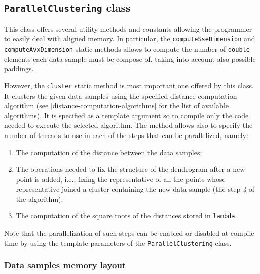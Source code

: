 \documentclass{article}
\begin{document}
\hypertarget{parallel-clustering}{%
    \subsection{\texttt{ParallelClustering} class}
    \label{parallel-clustering}}

This class offers several utility methods and constants allowing the programmer to easily deal
with aligned memory. In particular, the \texttt{computeSseDimension} and
\texttt{computeAvxDimension} static methods allows to compute the number of \texttt{double}
elements each data sample must be compose of, taking into account also possible paddings.

However, the \texttt{cluster} static method is most important one offered by this class. It clusters
the given data samples using the specified distance computation algorithm (see
\ref{distance-computation-algorithms} for the list of available algorithms).
It is specified as a template argument so to compile only the code needed to execute the selected
algorithm.
The method allows also to specify the number of threads to use in each of the steps that can be
parallelized, namely:
\begin{enumerate}
    \item The computation of the distance between the data samples;
    \item The operations needed to fix the structure of the dendrogram after a new point is
    added, i.e., fixing the representative of all the points whose representative joined a
    cluster containing the new data sample (the step \textit{4} of the algorithm);
    \item The computation of the square roots of the distances stored in \texttt{lambda}.
\end{enumerate}
Note that the parallelization of such steps can be enabled or disabled at compile time by using the
template parameters of the \texttt{ParallelClustering} class.

\hypertarget{par-data-samples-layout}{
    \subsubsection{Data samples memory layout}
    \label{par-data-samples-layout}}
\end{document}

